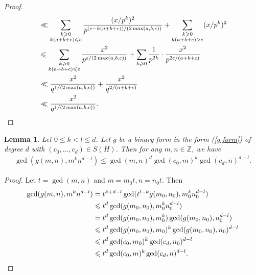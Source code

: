\documentclass[reqno, 11pt]{amsart}
\renewcommand{\leq}{\leqslant}
\renewcommand{\geq}{\geqslant}
\newtheorem{lemma}[theorem]{Lemma}
\theoremstyle{definition}
\theoremstyle{definition}
\renewcommand{\geq}{\geqslant}
\renewcommand{\leq}{\leqslant}
\newcommand{\ZZ}{\mathbb{Z}}
\numberwithin{equation}{section}
\begin{document}
\begin{proof}
\begin{align*}
     & \ll \sum_{\substack{k \geq 0 \\ k(a+b+c) \leq e}} \frac{(x/p^k)^2}{p^{(e-k(a+b+c))/(2 \max (a,b,c))}} + \sum_{\substack{k \geq 0 \\ k(a+b+c) > e}} (x/p^k)^2 \\
     & \leq \sum_{\substack{k \geq 0 \\ k(a+b+c) \leq e}} \frac{x^2}{p^{e/(2 \max (a,b,c))}} +  \sum_{\substack{k \geq 0}} \frac{1}{p^{2k}} \cdot \frac{x^2}{p^{2e/(a+b+c)}} \\
     & \ll \frac{x^2}{q^{1/(2 \max (a,b,c))}} + \frac{x^2}{q^{2/(a+b+c)}} \\
     & \ll \frac{x^2}{q^{1/ (2\max(a,b,c))}}.\qedhere
    \end{align*}
\end{proof}



\begin{lemma}\label{Lemma-1.3}
	Let $0 \leq k < l \leq d$. Let $g$ be a binary form in the form (\ref{g-form}) of degree $d$ with $(c_0,\dots,c_d)\in S(H)$. Then for any $m, n \in \ZZ$, we have 
	\begin{eqnarray*}
		\gcd(g(m, n), m^k n^{d-l}) \leq \gcd(m,n)^d \gcd(c_0,m)^k \gcd(c_d,n)^{d-l}.
	\end{eqnarray*}
\end{lemma}
\begin{proof}
	Let $t = \gcd(m, n)$ and $m = m_0t, n = n_0t$. Then
	\begin{align*}
		\gcd(g(m,n), m^k n^{d-l}) & = t^{k+d-l} \gcd(t^{l-k}g(m_0,n_0), m_0^kn_0^{d-l}) \\
            & \leq t^{d} \gcd(g(m_0,n_0), m_0^k n_0^{d-l}) \\
		& = t^{d} \gcd(g(m_0,n_0), m_0^k) \gcd(g(m_0,n_0), n_0^{d-l}) \\
            & \leq t^{d} \gcd(g(m_0,n_0), m_0)^k \gcd(g(m_0,n_0), n_0)^{d-l} \\
		& \leq t^{d} \gcd(c_0, m_0)^k \gcd(c_d, n_0)^{d-l} \\
		& \leq t^d \gcd(c_0, m)^k \gcd(c_d, n)^{d-l}.\qedhere
	\end{align*}
\end{proof}
\end{document}
